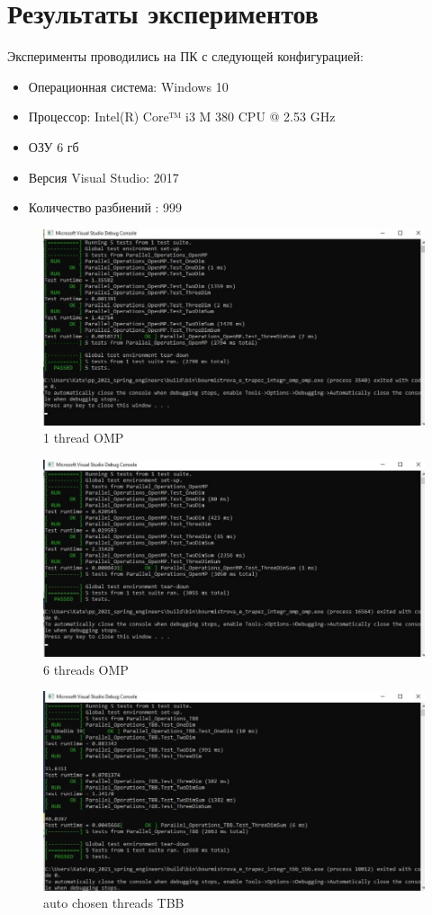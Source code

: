 \documentclass{report}
\begin{document}
\section*{Результаты экспериментов}
Эксперименты проводились на ПК с следующей конфигурацией:
\begin{itemize}
\item Операционная система: Windows 10
\item Процессор: Intel(R) Core™ i3 M 380 CPU @ 2.53 GHz
\item ОЗУ 6 гб
\item Версия Visual Studio: 2017
\item Количество разбиений : 999
\end{itemize}
\begin{figure}[ht]
\includegraphics[scale=0.6]
{bur_img/ph1.jpg}
\caption{1 thread OMP}
\end{figure}
\begin{figure}[ht]
\includegraphics[scale=0.6]
{bur_img/ph6.jpg}
\caption{6 threads OMP}
\end{figure}
\begin{figure}[ht]
\includegraphics[scale=0.6]
{bur_img/phtbb.jpg}
\caption{auto chosen threads TBB}
\end{figure}
\newpage
\end{document}
